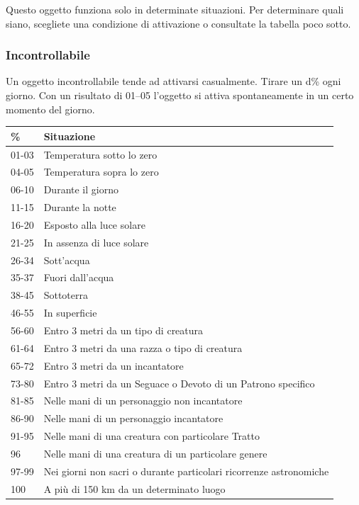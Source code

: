 \begin{multicols}{2}
	Questo oggetto funziona solo in determinate situazioni. Per determinare quali siano, scegliete una condizione di attivazione o consultate la tabella poco sotto.

	\subsubsection{Incontrollabile}

	Un oggetto incontrollabile tende ad attivarsi casualmente. Tirare un d\% ogni giorno. Con un risultato di 01--05 l'oggetto si attiva spontaneamente in un certo momento del giorno.

	\medskip

	\begin{tabularx}{0.45\textwidth}{lX}
		\textbf{\%} & \textbf{Situazione}\\
		\toprule
		01-03       & Temperatura sotto lo zero\\
		04-05       & Temperatura sopra lo zero\\
		06-10       & Durante il giorno\\
		11-15       & Durante la notte\\
		16-20       & Esposto alla luce solare\\
		21-25       & In assenza di luce solare\\
		26-34       & Sott'acqua\\
		35-37       & Fuori dall'acqua\\
		38-45       & Sottoterra\\
		46-55       & In superficie\\
		56-60       & Entro 3 metri da un tipo di creatura\\
		61-64       & Entro 3 metri da una razza o tipo di creatura\\
		65-72       & Entro 3 metri da un incantatore\\
		73-80       & Entro 3 metri da un Seguace o Devoto di un Patrono specifico\\
		81-85       & Nelle mani di un personaggio non incantatore\\
		86-90       & Nelle mani di un personaggio incantatore\\
		91-95       & Nelle mani di una creatura con particolare Tratto\\
		96          & Nelle mani di una creatura di un particolare genere\\
		97-99       & Nei giorni non sacri o durante particolari ricorrenze astronomiche\\
		100         & A più di 150 km da un determinato luogo\\
	\end{tabularx}


\end{multicols}
